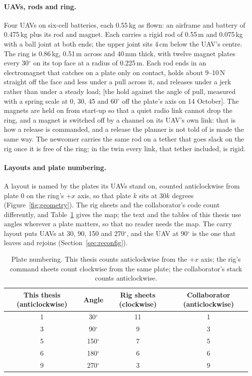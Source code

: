 \paragraph{UAVs, rods and ring.} Four UAVs on six-cell batteries, each 0.55\,kg as flown: an airframe and battery of
0.475\,kg plus its rod and magnet. Each carries a rigid rod of 0.55\,m and 0.075\,kg with a ball joint at both
ends; the upper joint sits 4\,cm below the UAV's centre. The ring is 0.86\,kg, 0.51\,m across and 40\,mm thick, with
twelve magnet plates every 30$^\circ$ on its top face at a radius of 0.225\,m. Each rod ends in an electromagnet
that catches on a plate only on contact, holds about 9--10\,N straight off the face and less under a pull across
it, and releases under a jerk rather than under a steady load; [the hold against the angle of pull, measured with
a spring scale at 0, 30, 45 and 60$^\circ$ off the plate's axis on 14 October]. The magnets are held on from
start-up so that a quiet radio link cannot drop the ring, and a magnet is switched off by a channel on its UAV's
own link: that is how a release is commanded, and a release the planner is not told of is made the same way. The
newcomer carries the same rod on a tether that goes slack on the rig once it is free of the ring; in the twin
every link, that tether included, is rigid.

\paragraph{Layouts and plate numbering.} A layout is named by the plates its UAVs stand on, counted anticlockwise
from plate 0 on the ring's $+x$ axis, so that plate $k$ sits at $30k$ degrees (Figure~\ref{fig:geometry}). The rig
sheets and the collaborator's code count differently, and Table~\ref{tab:plates} gives the map; the text and the
tables of this thesis use angles wherever a plate matters, so that no reader needs the map. The carry layout puts
UAVs at 30, 90, 150 and 270$^\circ$, and the UAV at 90$^\circ$ is the one that leaves and rejoins
(Section~\ref{sec:reconfig}).

\begin{table}[h]
\centering
\small
\caption{Plate numbering. This thesis counts anticlockwise from the $+x$ axis; the rig's command sheets count
clockwise from the same plate; the collaborator's stack counts anticlockwise.}
\label{tab:plates}
\begin{tabular}{cccc}
\toprule
This thesis (anticlockwise) & Angle & Rig sheets (clockwise) & Collaborator (anticlockwise) \\
\midrule
1 & 30$^\circ$ & 11 & 1 \\
3 & 90$^\circ$ & 9 & 3 \\
5 & 150$^\circ$ & 7 & 5 \\
6 & 180$^\circ$ & 6 & 6 \\
9 & 270$^\circ$ & 3 & 9 \\
\bottomrule
\end{tabular}
\end{table}

